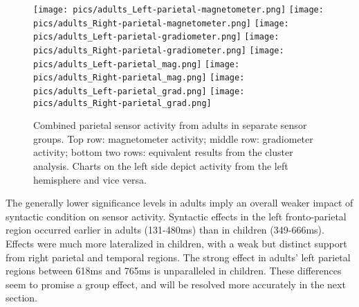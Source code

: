 \begin{figure}[!h]
\begin{center}
\texttt{[image: pics/adults\_Left-parietal-magnetometer.png]}
\texttt{[image: pics/adults\_Right-parietal-magnetometer.png]}
\texttt{[image: pics/adults\_Left-parietal-gradiometer.png]}
\texttt{[image: pics/adults\_Right-parietal-gradiometer.png]}
\texttt{[image: pics/adults\_Left-parietal\_mag.png]}
\texttt{[image: pics/adults\_Right-parietal\_mag.png]}
\texttt{[image: pics/adults\_Left-parietal\_grad.png]}
\texttt{[image: pics/adults\_Right-parietal\_grad.png]}
\caption{\label{4.2.activity.adults.parietal} Combined parietal sensor activity from adults in separate sensor groups. Top row: magnetometer activity; middle row: gradiometer activity; bottom two rows: equivalent results from the cluster analysis. Charts on the left side depict activity from the left hemisphere and vice versa.}
\end{center}
\end{figure}


The generally lower significance levels in adults imply an overall weaker impact of syntactic condition on sensor activity.
Syntactic effects in the left fronto-parietal region occurred earlier in adults (131-480ms) than in children (349-666ms).
Effects were much more lateralized in children, with a weak but distinct support from right parietal and temporal regions.
The strong effect in adults' left parietal regions between 618ms and 765ms is unparalleled in children.
These differences seem to promise a group effect, and will be resolved more accurately in the next section.

\clearpage